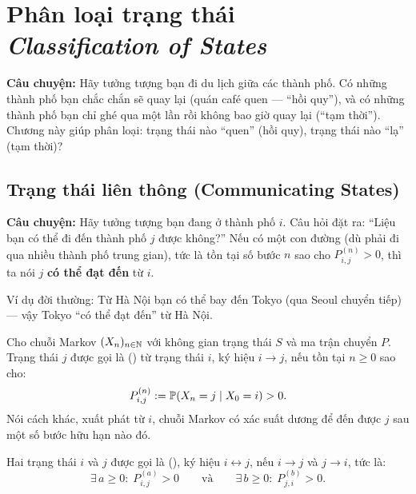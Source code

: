 \chapter{Phân loại trạng thái\\{\normalsize\textit{Classification of States}}}
\label{ch:classification}

\textbf{Câu chuyện:} Hãy tưởng tượng bạn đi du lịch giữa các thành phố.
Có những thành phố bạn chắc chắn sẽ quay lại (quán café quen --- ``hồi quy''),
và có những thành phố bạn chỉ ghé qua một lần rồi không bao giờ quay lại (``tạm thời'').
Chương này giúp phân loại: trạng thái nào ``quen'' (hồi quy), trạng thái nào ``lạ'' (tạm thời)?

\section{Trạng thái liên thông (Communicating States)}
\label{sec:communicating-states}

\textbf{Câu chuyện:} Hãy tưởng tượng bạn đang ở thành phố $i$. Câu hỏi đặt ra:
``Liệu bạn có thể đi đến thành phố $j$ được không?''
Nếu có một con đường (dù phải đi qua nhiều thành phố trung gian),
tức là tồn tại số bước $n$ sao cho $P_{i,j}^{(n)} > 0$,
thì ta nói $j$ \textbf{có thể đạt đến} từ $i$.

Ví dụ đời thường: Từ Hà Nội bạn có thể bay đến Tokyo (qua Seoul chuyển tiếp)
--- vậy Tokyo ``có thể đạt đến'' từ Hà Nội.

\begin{dinhnghia}
\label{def:accessible}
Cho chuỗi Markov $(X_n)_{n \in \mathbb{N}}$ với không gian trạng thái $S$ và ma trận chuyển $P$.
Trạng thái $j$ được gọi là  () từ trạng thái $i$,
ký hiệu $i \to j$, nếu tồn tại $n \geq 0$ sao cho:
\[
  P_{i,j}^{(n)} := \mathbb{P}(X_n = j \mid X_0 = i) > 0.
\]
Nói cách khác, xuất phát từ $i$, chuỗi Markov có xác suất dương để đến được $j$
sau một số bước hữu hạn nào đó.
\end{dinhnghia}

\begin{dinhnghia}
\label{def:communicating}
Hai trạng thái $i$ và $j$ được gọi là  (),
ký hiệu $i \leftrightarrow j$, nếu $i \to j$ và $j \to i$, tức là:
\[
  \exists\, a \geq 0: \; P_{i,j}^{(a)} > 0
  \qquad \text{và} \qquad
  \exists\, b \geq 0: \; P_{j,i}^{(b)} > 0.
\]
\end{dinhnghia}

